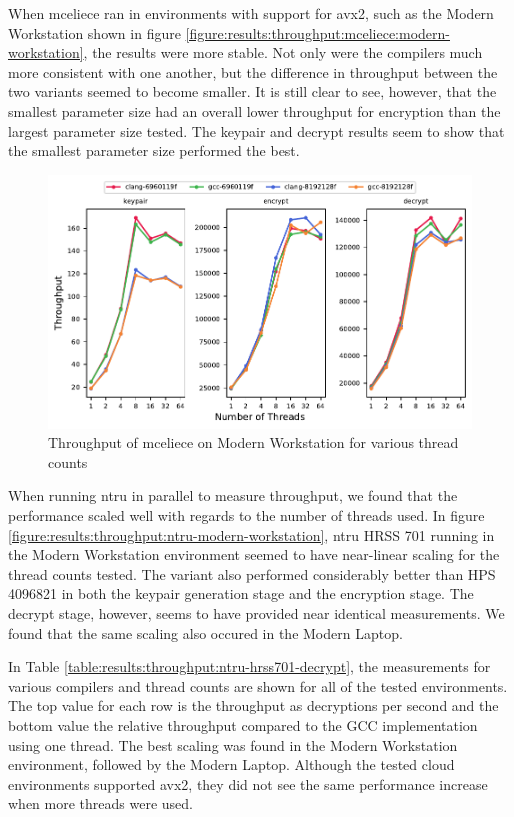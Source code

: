 \noindent When \gls{mceliece} ran in environments with support for \gls{avx2}, such as the Modern Workstation shown in figure \ref{figure:results:throughput:mceliece:modern-workstation}, the results were more stable. Not only were the compilers much more consistent with one another, but the difference in throughput between the two variants seemed to become smaller. It is still clear to see, however, that the smallest parameter size had an overall lower throughput for encryption than the largest parameter size tested. The keypair and decrypt results seem to show that the smallest parameter size performed the best.

\begin{figure}
    \centering
    \includegraphics[scale=0.75]{chapters/results/throughput/Modern Workstation_mceliece.pdf}
    \caption{Throughput of \gls{mceliece} on Modern Workstation for various thread counts}
    \label{figure:results:throughput:mceliece-modern-workstation}
\end{figure}

When running \gls{ntru} in parallel to measure throughput, we found that the performance scaled well with regards to the number of threads used. In figure \ref{figure:results:throughput:ntru-modern-workstation}, \gls{ntru} HRSS 701 running in the Modern Workstation environment seemed to have near-linear scaling for the thread counts tested. The variant also performed considerably better than HPS 4096821 in both the keypair generation stage and the encryption stage. The decrypt stage, however, seems to have provided near identical measurements. We found that the same scaling also occured in the Modern Laptop.

In Table \ref{table:results:throughput:ntru-hrss701-decrypt}, the measurements for various compilers and thread counts are shown for all of the tested environments. The top value for each row is the throughput as decryptions per second and the bottom value the relative throughput compared to the GCC implementation using one thread. The best scaling was found in the Modern Workstation environment, followed by the Modern Laptop. Although the tested cloud environments supported \gls{avx2}, they did not see the same performance increase when more threads were used. %

